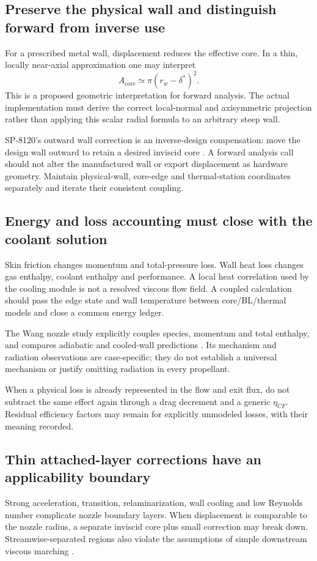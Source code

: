 \subsection{Preserve the physical wall and distinguish forward from inverse use}
For a prescribed metal wall, displacement reduces the effective core.
In a thin, locally near-axial approximation one may interpret
\begin{equation}
A_{\mathrm{core}}\simeq\pi(r_w-\delta^*)^2.
\end{equation}
This is a proposed geometric interpretation for forward analysis.
The actual implementation must derive the correct local-normal and
axisymmetric projection rather than applying this scalar radial formula
to an arbitrary steep wall.

SP-8120's outward wall correction is an inverse-design compensation:
move the design wall outward to retain a desired inviscid core
\cite[PDF p.~27]{sp8120}. A forward analysis call should not alter the
manufactured wall or export displacement as hardware geometry.
Maintain physical-wall, core-edge and thermal-station coordinates
separately and iterate their consistent coupling.

\subsection{Energy and loss accounting must close with the coolant solution}
Skin friction changes momentum and total-pressure loss. Wall heat loss
changes gas enthalpy, coolant enthalpy and performance. A local heat
correlation used by the cooling module is not a resolved viscous flow field.
A coupled calculation should pass the edge state and wall temperature
between core/BL/thermal models and close a common energy ledger.

The Wang nozzle study explicitly couples species, momentum and total
enthalpy, and compares adiabatic and cooled-wall predictions
\cite[PDF pp.~2, 5, 7]{wang}. Its mechanism and radiation observations
are case-specific; they do not establish a universal mechanism or justify
omitting radiation in every propellant.

When a physical loss is already represented in the flow and exit flux,
do not subtract the same effect again through a drag decrement and a
generic \(\eta_{CF}\). Residual efficiency factors may remain for
explicitly unmodeled losses, with their meaning recorded.

\subsection{Thin attached-layer corrections have an applicability boundary}
Strong acceleration, transition, relaminarization, wall cooling and
low Reynolds number complicate nozzle boundary layers. When displacement
is comparable to the nozzle radius, a separate inviscid core plus small
correction may break down. Streamwise-separated regions also violate the
assumptions of simple downstream viscous marching
\cite[PDF pp.~4--5]{pns}\cite[PDF p.~33]{sp8120}.

